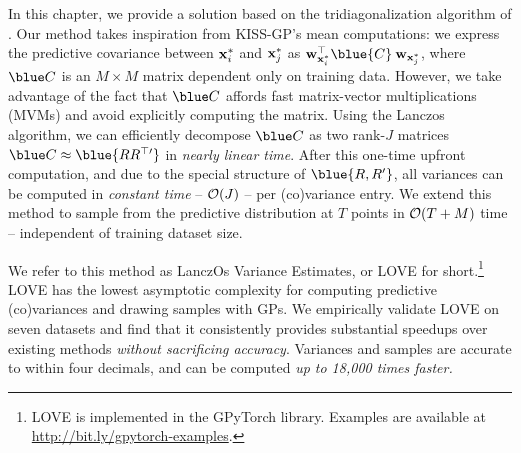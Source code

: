In this chapter, we provide a solution based on the tridiagonalization algorithm of \citet{lanczos1950iteration}.
Our method takes inspiration from KISS-GP's mean computations: we express the predictive covariance between $\mathbf{x}^*_i$ and $\mathbf{x}^{*}_j$ as
$\bw_{\bxtest_i}^\top \blue{\bC} \: \bw_{\bxtest_j}$,
where $\blue C$ is an $M \times M$ matrix dependent only on training data.
However, we take advantage of the fact that $\blue \bC$ affords fast matrix-vector multiplications (MVMs) and avoid explicitly computing the matrix.
Using the Lanczos algorithm, we can efficiently decompose $\blue \bC$ as two rank-$J$ matrices $\blue \bC \approx \blue{\bR \bR^{\top \prime}}$ in \emph{nearly linear time}.
After this one-time upfront computation, and due to the special structure of $\blue {\bR,\bR^\prime}$, all variances can be computed in \emph{constant time} -- $\bigo{J}$ -- per (co)variance entry.
We extend this method to sample from the predictive distribution at $T$ points in $\bigo{T + M}$ time -- independent of training dataset size.

We refer to this method as LanczOs Variance Estimates, or LOVE{} for short.\footnote{
  LOVE{} is implemented in the GPyTorch library.
  Examples are available at \url{http://bit.ly/gpytorch-examples}.
}
LOVE{} has the lowest asymptotic complexity for computing predictive (co)variances and drawing samples with GPs.
We empirically validate LOVE{} on seven datasets and find that it consistently provides substantial speedups over existing methods \emph{without sacrificing accuracy}.
Variances and samples are accurate to within four decimals, and can be computed \emph{up to 18,000 times faster.}
